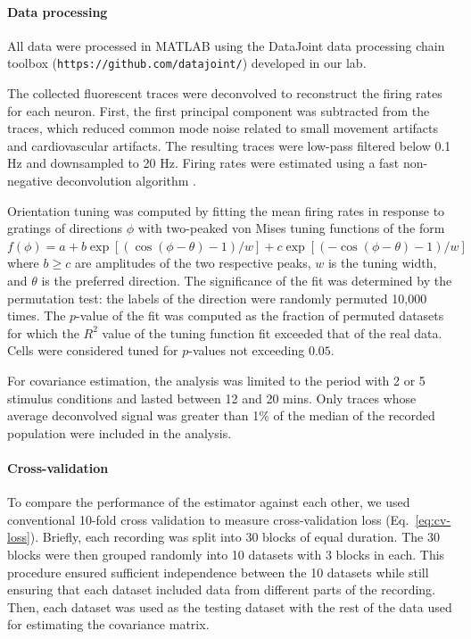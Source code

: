\documentclass[10pt]{article}
\begin{document}
\paragraph{Data processing}
All data were processed in MATLAB using the DataJoint data processing chain toolbox ({\tt https://github.com/datajoint/}) developed in our lab. 

The collected fluorescent traces were deconvolved to reconstruct the firing rates for each neuron. First, the first principal component was subtracted from the traces, which reduced common mode noise related to small movement artifacts and cardiovascular artifacts. The resulting traces were low-pass filtered below 0.1 Hz and downsampled to 20 Hz. Firing rates were estimated using a fast non-negative deconvolution algorithm \cite{Vogelstein:2010}.

Orientation tuning was computed by fitting the mean firing rates in response to gratings of directions $\phi$ with two-peaked von Mises tuning functions of the form $f(\phi)=a + b\exp\left[(\cos(\phi-\theta)-1)/w\right] + c\exp\left[(-\cos(\phi-\theta)-1)/w\right]$ where $b\ge c$ are amplitudes of the two respective peaks, $w$ is the tuning width, and  $\theta$ is the preferred direction. The significance of the fit was determined by the permutation test: the labels of the direction were randomly permuted 10,000 times.  The $p$-value of the fit was computed as the fraction of permuted datasets for which the $R^2$ value of the tuning function fit exceeded that of the real data.  Cells were considered tuned for $p$-values not exceeding $0.05$.

For covariance estimation, the analysis was limited to the period with 2 or 5 stimulus conditions and lasted between 12 and 20 mins.  Only traces whose average deconvolved signal was greater than 1\% of the median of the recorded population were included in the analysis.  
\paragraph{Cross-validation}
To compare the performance of the estimator against each other, we used conventional 10-fold cross validation to measure cross-validation loss (Eq.~\ref{eq:cv-loss}). Briefly, each recording was split into 30 blocks of equal duration.  The 30 blocks were then grouped randomly into 10 datasets with 3 blocks in each.  This procedure ensured sufficient independence between the 10 datasets while still ensuring that each dataset included data from different parts of the recording.   Then, each dataset was used as the testing dataset with the rest of the data used for estimating the covariance matrix.  
\end{document}
